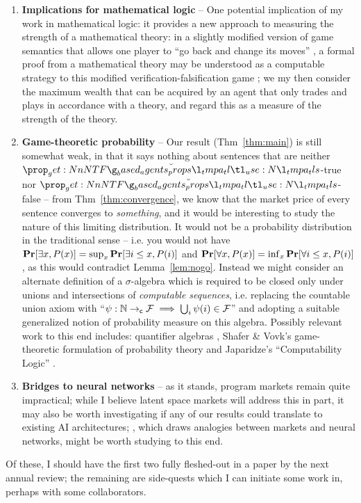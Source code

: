 \documentclass{article}
\begin{document}
\begin{enumerate}
    \item \textbf{Implications for mathematical logic} -- One potential implication of my work in mathematical logic: it provides a new approach to measuring the strength of a mathematical theory: in a slightly modified version of game semantics that allows one player to ``go back and change its moves'' \cite{bonnayPreuvesJeuxSemantiques2004}, a formal proof from a mathematical theory may be understood as a computable strategy to this modified verification-falsification game \cite{boyerProofTruth2012b}; we my then consider the maximum wealth that can be acquired by an agent that only trades and plays in accordance with a theory, and regard this as a measure of the strength of the theory.
    \item\textbf{Game-theoretic probability} -- Our result (Thm~\ref{thm:main}) is still somewhat weak, in that it says nothing about sentences that are neither $\instaplayer[s]$-true nor $\instaplayer[s]$-false -- from Thm~\ref{thm:convergence}, we know that the market price of every sentence converges to \emph{something}, and it would be interesting to study the nature of this limiting distribution. It would not be a probability distribution in the traditional sense -- i.e. you would not have $\mathbf{Pr}[\exists x,P(x)]=\sup_x\mathbf{Pr}[\exists i\le x,P(i)]$ and $\mathbf{Pr}[\forall x,P(x)]=\inf_x\mathbf{Pr}[\forall i\le x,P(i)]$, as this would contradict Lemma~\ref{lem:nogo}. Instead we might consider an alternate definition of a $\sigma$-algebra which is required to be closed only under unions and intersections of \emph{computable sequences}, i.e. replacing the countable union axiom with ``$\psi:\mathbb{N}\to_{\mathsf{c}}\mathcal{F}\implies\bigcup_i\psi(i)\in\mathcal{F}$'' and adopting a suitable generalized notion of probability measure on this algebra. Possibly relevant work to this end includes: quantifier algebras \cite{cwooQuantifierAlgebra2013}, Shafer \& Vovk's game-theoretic formulation of probability theory \cite{shaferProbabilityFinanceIt2005, shaferGameTheoreticFoundationsProbability2019} and Japaridze's ``Computability Logic'' \cite{japaridzeBeginningWasGame2009, japaridzeSurveyComputabilityLogic2015}.
    \item \textbf{Bridges to neural networks} -- as it stands, program markets remain quite impractical; while I believe latent space markets will address this in part, it may also be worth investigating if any of our results could translate to existing AI architectures; \cite{wentworthCompetitiveMarketsDistributed2018}, which draws analogies between markets and neural networks, might be worth studying to this end.
\end{enumerate}
Of these, I should have the first two fully fleshed-out in a paper by the next annual review; the remaining are side-quests which I can initiate some work in, perhaps with some collaborators.
\end{document}
